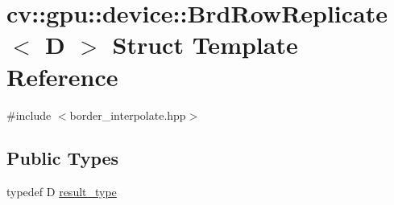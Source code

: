 \hypertarget{structcv_1_1gpu_1_1device_1_1BrdRowReplicate}{\section{cv\-:\-:gpu\-:\-:device\-:\-:Brd\-Row\-Replicate$<$ D $>$ Struct Template Reference}
\label{structcv_1_1gpu_1_1device_1_1BrdRowReplicate}
}


{\ttfamily \#include $<$border\-\_\-interpolate.\-hpp$>$}

\subsection*{Public Types}
\begin{DoxyCompactItemize}
\item 
typedef D \hyperlink{structcv_1_1gpu_1_1device_1_1BrdRowReplicate_a9f820c457dd75df4aaa76321cab4196b}{result\-\_\-type}
\end{DoxyCompactItemize}
